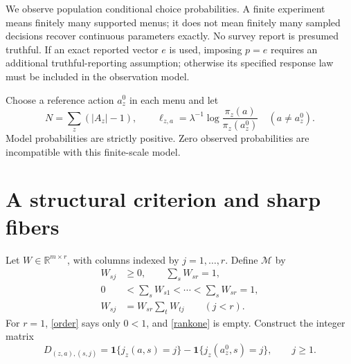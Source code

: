\documentclass[11pt]{article}
\newcommand{\R}{\mathbb R}
\newcommand{\M}{\mathcal M}
\newcommand{\ind}{\mathbf1}
\begin{document}
We observe population conditional choice probabilities. A finite experiment means finitely many supported menus; it does not mean finitely many sampled decisions recover continuous parameters exactly. No survey report is presumed truthful. If an exact reported vector $e$ is used, imposing $p=e$ requires an additional truthful-reporting assumption; otherwise its specified response law must be included in the observation model.

Choose a reference action $a_z^0$ in each menu and let
\[
 N=\sum_z(|A_z|-1),\qquad
 \ell_{z,a}=\lambda^{-1}\log\frac{\pi_z(a)}{\pi_z(a_z^0)}
 \quad(a\ne a_z^0).
\]
Model probabilities are strictly positive. Zero observed probabilities are incompatible with this finite-scale model.

\section{A structural criterion and sharp fibers}
Let $W\in\R^{m\times r}$, with columns indexed by $j=1,\ldots,r$. Define $\M$ by
\begin{align}
 W_{sj}&\ge0,\qquad \sum_sW_{sr}=1,\label{normalization}\\
 0&<\sum_sW_{s1}<\cdots<\sum_sW_{sr}=1,\label{order}\\
 W_{sj}&=W_{sr}\sum_tW_{tj}\qquad(j<r).\label{rankone}
\end{align}
For $r=1$, \eqref{order} says only $0<1$, and \eqref{rankone} is empty. Construct the integer matrix
\[
 D_{(z,a),(s,j)}=\ind\{j_z(a,s)=j\}
                    -\ind\{j_z(a_z^0,s)=j\},\qquad j\ge1.
\]
\end{document}
